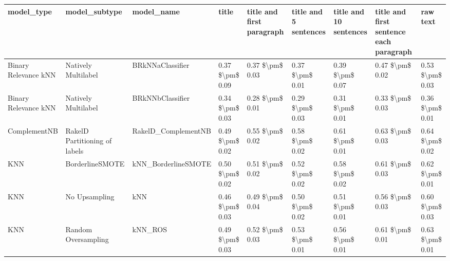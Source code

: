 \begin{tabular}{lllllllll}
\toprule
                     model\_type &                 model\_subtype &                                   model\_name &           title & title and first paragraph & title and 5 sentences & title and 10 sentences & title and first sentence each paragraph &            raw text \\
\midrule
           Binary Relevance kNN &           Natively Multilabel &                             BRkNNaClassifier & 0.37 \$\textbackslash pm\$ 0.09 &           0.37 \$\textbackslash pm\$ 0.03 &       0.37 \$\textbackslash pm\$ 0.01 &        0.39 \$\textbackslash pm\$ 0.07 &                         0.47 \$\textbackslash pm\$ 0.02 &     0.53 \$\textbackslash pm\$ 0.03 \\
           Binary Relevance kNN &           Natively Multilabel &                             BRkNNbClassifier & 0.34 \$\textbackslash pm\$ 0.03 &           0.28 \$\textbackslash pm\$ 0.01 &       0.29 \$\textbackslash pm\$ 0.03 &        0.31 \$\textbackslash pm\$ 0.01 &                         0.33 \$\textbackslash pm\$ 0.03 &     0.36 \$\textbackslash pm\$ 0.01 \\
                   ComplementNB & RakelD Partitioning of labels &                          RakelD\_ComplementNB & 0.49 \$\textbackslash pm\$ 0.02 &           0.55 \$\textbackslash pm\$ 0.02 &       0.58 \$\textbackslash pm\$ 0.02 &        0.61 \$\textbackslash pm\$ 0.01 &                         0.63 \$\textbackslash pm\$ 0.03 &     0.64 \$\textbackslash pm\$ 0.02 \\
                            KNN &               BorderlineSMOTE &                          kNN\_BorderlineSMOTE & 0.50 \$\textbackslash pm\$ 0.02 &           0.51 \$\textbackslash pm\$ 0.02 &       0.52 \$\textbackslash pm\$ 0.02 &        0.58 \$\textbackslash pm\$ 0.02 &                         0.61 \$\textbackslash pm\$ 0.03 &     0.62 \$\textbackslash pm\$ 0.01 \\
                            KNN &                 No Upsampling &                                          kNN & 0.46 \$\textbackslash pm\$ 0.03 &           0.49 \$\textbackslash pm\$ 0.04 &       0.50 \$\textbackslash pm\$ 0.02 &        0.51 \$\textbackslash pm\$ 0.01 &                         0.56 \$\textbackslash pm\$ 0.03 &     0.60 \$\textbackslash pm\$ 0.03 \\
                            KNN &           Random Oversampling &                                      kNN\_ROS & 0.49 \$\textbackslash pm\$ 0.03 &           0.52 \$\textbackslash pm\$ 0.03 &       0.53 \$\textbackslash pm\$ 0.01 &        0.56 \$\textbackslash pm\$ 0.01 &                         0.61 \$\textbackslash pm\$ 0.01 &     0.63 \$\textbackslash pm\$ 0.01 \\

\end{tabular}
